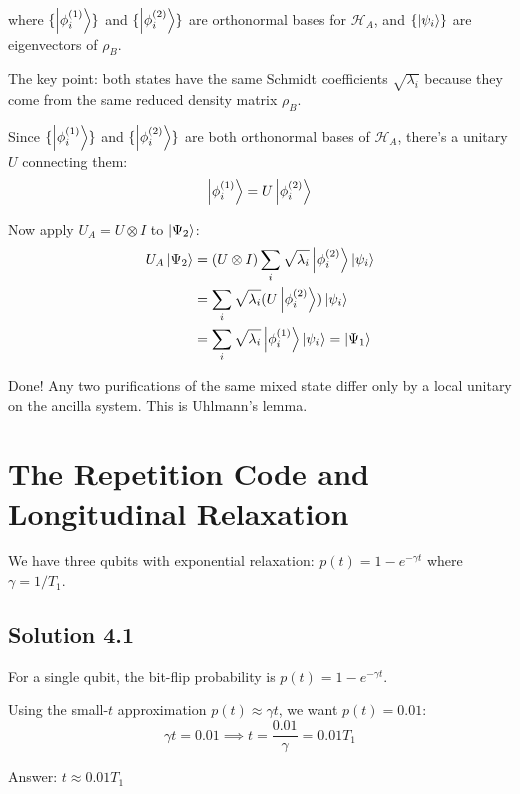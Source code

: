 \documentclass[11pt]{article}
\begin{document}
where $\{\ket{\phi_i^{(1)}}\}$ and $\{\ket{\phi_i^{(2)}}\}$ are orthonormal bases for $\mathcal{H}_A$, and $\{\ket{\psi_i}\}$ are eigenvectors of $\rho_B$.

The key point: both states have the same Schmidt coefficients $\sqrt{\lambda_i}$ because they come from the same reduced density matrix $\rho_B$.

Since $\{\ket{\phi_i^{(1)}}\}$ and $\{\ket{\phi_i^{(2)}}\}$ are both orthonormal bases of $\mathcal{H}_A$, there's a unitary $U$ connecting them:
\begin{equation*}
    \ket{\phi_i^{(1)}} = U \ket{\phi_i^{(2)}}
\end{equation*}

Now apply $U_A = U \otimes I$ to $\ket{\Psi_2}$:
\begin{align*}
    U_A \ket{\Psi_2} &= (U \otimes I) \sum_i \sqrt{\lambda_i} \ket{\phi_i^{(2)}} \ket{\psi_i} \\
    &= \sum_i \sqrt{\lambda_i} (U\ket{\phi_i^{(2)}}) \ket{\psi_i} \\
    &= \sum_i \sqrt{\lambda_i} \ket{\phi_i^{(1)}} \ket{\psi_i} = \ket{\Psi_1}
\end{align*}

Done! Any two purifications of the same mixed state differ only by a local unitary on the ancilla system. This is Uhlmann's lemma.

\clearpage

\section{The Repetition Code and Longitudinal Relaxation}

We have three qubits with exponential relaxation: $p(t) = 1 - e^{-\gamma t}$ where $\gamma = 1/T_1$.

\subsection{Solution 4.1}

For a single qubit, the bit-flip probability is $p(t) = 1 - e^{-\gamma t}$.

Using the small-$t$ approximation $p(t) \approx \gamma t$, we want $p(t) = 0.01$:
\begin{equation*}
    \gamma t = 0.01 \implies t = \frac{0.01}{\gamma} = 0.01 T_1
\end{equation*}

Answer: $t \approx 0.01 T_1$
\end{document}
